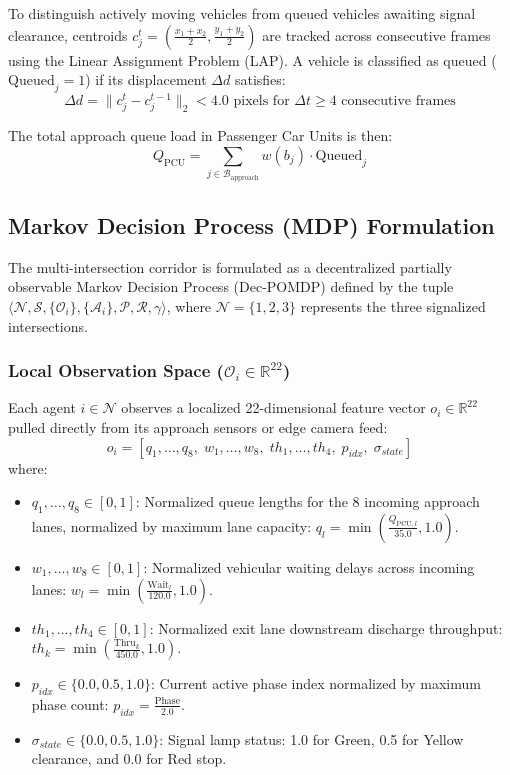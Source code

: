 To distinguish actively moving vehicles from queued vehicles awaiting signal clearance, centroids $c_j^t = \left(\frac{x_1 + x_2}{2}, \frac{y_1 + y_2}{2}\right)$ are tracked across consecutive frames using the Linear Assignment Problem (LAP). A vehicle is classified as queued ($\text{Queued}_j = 1$) if its displacement $\Delta d$ satisfies:
\begin{equation}
\Delta d = \|c_j^t - c_j^{t-1}\|_2 < 4.0 \text{ pixels for } \Delta t \ge 4 \text{ consecutive frames}
\end{equation}

The total approach queue load in Passenger Car Units is then:
\begin{equation}
Q_{\text{PCU}} = \sum_{j \in \mathcal{B}_{\text{approach}}} w(b_j) \cdot \text{Queued}_j
\end{equation}

\subsection{Markov Decision Process (MDP) Formulation}
The multi-intersection corridor is formulated as a decentralized partially observable Markov Decision Process (Dec-POMDP) defined by the tuple $\langle \mathcal{N}, \mathcal{S}, \{\mathcal{O}_i\}, \{\mathcal{A}_i\}, \mathcal{P}, \mathcal{R}, \gamma \rangle$, where $\mathcal{N} = \{1, 2, 3\}$ represents the three signalized intersections.

\subsubsection{Local Observation Space ($\mathcal{O}_i \in \mathbb{R}^{22}$)}
Each agent $i \in \mathcal{N}$ observes a localized 22-dimensional feature vector $o_i \in \mathbb{R}^{22}$ pulled directly from its approach sensors or edge camera feed:
\begin{equation}
o_i = [q_1, \dots, q_8, \; w_1, \dots, w_8, \; th_1, \dots, th_4, \; p_{idx}, \; \sigma_{state}]
\end{equation}
where:
\begin{itemize}
    \item $q_1, \dots, q_8 \in [0, 1]$: Normalized queue lengths for the 8 incoming approach lanes, normalized by maximum lane capacity: $q_l = \min\left(\frac{Q_{\text{PCU}, l}}{35.0}, 1.0\right)$.
    \item $w_1, \dots, w_8 \in [0, 1]$: Normalized vehicular waiting delays across incoming lanes: $w_l = \min\left(\frac{\text{Wait}_l}{120.0}, 1.0\right)$.
    \item $th_1, \dots, th_4 \in [0, 1]$: Normalized exit lane downstream discharge throughput: $th_k = \min\left(\frac{\text{Thru}_k}{450.0}, 1.0\right)$.
    \item $p_{idx} \in \{0.0, 0.5, 1.0\}$: Current active phase index normalized by maximum phase count: $p_{idx} = \frac{\text{Phase}}{2.0}$.
    \item $\sigma_{state} \in \{0.0, 0.5, 1.0\}$: Signal lamp status: 1.0 for Green, 0.5 for Yellow clearance, and 0.0 for Red stop.
\end{itemize}

